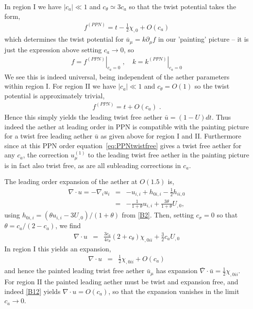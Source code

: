 \documentclass[12pt]{article}
\numberwithin{equation}{section}
\begin{document}
In region I we have $| c_a | \ll 1$ and $c_\theta \simeq 3 c_a$ so that the twist potential takes the form,
\begin{eqnarray}
f^{(PPN)} = t - \frac{1}{2} \chi_{,0} + O(c_a)
\end{eqnarray}
which determines the twist potential for $\bar{u}_\mu = k \partial_\mu f$ in our 'painting' picture -- it is just the expression above setting $c_a \to 0$, so
\begin{eqnarray}
f = \left. f^{(PPN)} \right|_{c_a = 0} \; , \quad k = \left. k^{(PPN)} \right|_{c_a = 0}
\end{eqnarray}
We see this is indeed universal, being independent of the aether parameters within region I.
For region II we have $| c_a | \ll 1$ and $c_\theta = O(1)$ so the twist potential is approximately trivial,
\begin{eqnarray}
f^{(PPN)} = t + O(c_a) \; .
\end{eqnarray}
Hence this simply yields the leading twist free aether $\bar{u} = (1 - U) dt$.
Thus indeed the aether at leading order in PPN is compatible with the painting picture for a twist free leading aether $\bar{u}$ as given above for region I and II. Furthermore since at this PPN order equation~\eqref{eq:PPNtwistfree} gives a twist free aether for any $c_a$, the correction $u^{(1)}_\mu$ to the leading twist free aether in the painting picture
is in fact also twist free, as are all subleading corrections in $c_a$.

The leading order expansion of the aether at $O(1.5)$ is,
\begin{eqnarray}
\nabla \cdot u = - \nabla_i u_i &=& - u_{i,i} + h_{0i,i} - \frac{1}{2} h_{ii,0}  \nonumber \\
& = &  - \frac{ 1}{ 1 + \theta } u_{i,i} + \frac{3 \theta}{1 + \theta}  U_{,0}, 
\end{eqnarray}
using $h_{0i,i} =  (\theta u_{i,i} -3 U_{,0})/(1 + \theta )$ 
from \eqref{B2}. Then,
setting $c_\sigma = 0$ so that 
$\theta = c_a/(2 - c_{a})$,
we find 
\begin{eqnarray}\label{B12}
\nabla \cdot u & = &   \frac{3 c_a}{4 c_\theta} \left(   2 + c_\theta     \right) \chi_{,0ii} + \frac{3 }{2 }c_a U_{,0}
\end{eqnarray}
In region I this yields an expansion,
\begin{eqnarray}
\nabla \cdot u & = &   \frac{1}{2}\chi_{,0ii} + O(c_a)
\end{eqnarray}
and hence the painted leading twist free aether $\bar{u}_\mu$ has expansion $\bar{\nabla} \cdot \bar{u} = \frac{1}{2}\chi_{,0ii}$. 
For region II the painted leading aether must be twist and expansion free, and indeed \eqref{B12} yields $\nabla \cdot u = O(c_a)$, so that the expansion vanishes in the limit $c_a \to 0$.
\end{document}
